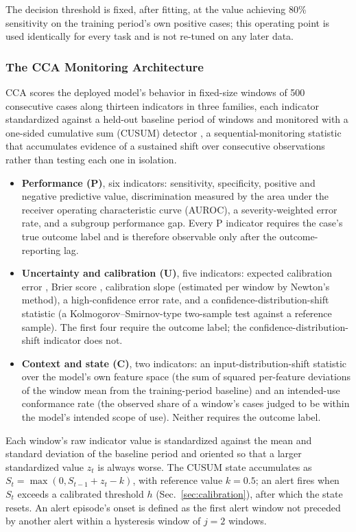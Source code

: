 \documentclass[apajournal,article,submit,oneauthor]{Definitions/mdpi}
\begin{document}
The decision threshold is fixed, after fitting, at the value achieving 80\% sensitivity on the training period's own positive cases; this operating point is used identically for every task and is not re-tuned on any later data.

\subsubsection{The CCA Monitoring Architecture}\label{sec:indicators}

CCA scores the deployed model's behavior in fixed-size windows of 500 consecutive cases along thirteen indicators in three families, each indicator standardized against a held-out baseline period of windows and monitored with a one-sided cumulative sum (CUSUM) detector \citep{page1954}, a sequential-monitoring statistic that accumulates evidence of a sustained shift over consecutive observations rather than testing each one in isolation.

\begin{itemize}
\item \textbf{Performance (P)}, six indicators: sensitivity, specificity, positive and negative predictive value, discrimination measured by the area under the receiver operating characteristic curve (AUROC), a severity-weighted error rate, and a subgroup performance gap. Every P indicator requires the case's true outcome label and is therefore observable only after the outcome-reporting lag.
\item \textbf{Uncertainty and calibration (U)}, five indicators: expected calibration error \citep{naeini2015}, Brier score \citep{brier1950}, calibration slope (estimated per window by Newton's method), a high-confidence error rate, and a confidence-distribution-shift statistic (a Kolmogorov--Smirnov-type two-sample test against a reference sample). The first four require the outcome label; the confidence-distribution-shift indicator does not.
\item \textbf{Context and state (C)}, two indicators: an input-distribution-shift statistic over the model's own feature space (the sum of squared per-feature deviations of the window mean from the training-period baseline) and an intended-use conformance rate (the observed share of a window's cases judged to be within the model's intended scope of use). Neither requires the outcome label.
\end{itemize}

Each window's raw indicator value is standardized against the mean and standard deviation of the baseline period and oriented so that a larger standardized value $z_t$ is always worse. The CUSUM state accumulates as $S_t = \max(0, S_{t-1} + z_t - k)$, with reference value $k = 0.5$; an alert fires when $S_t$ exceeds a calibrated threshold $h$ (Sec.~\ref{sec:calibration}), after which the state resets. An alert episode's onset is defined as the first alert window not preceded by another alert within a hysteresis window of $j = 2$ windows.
\end{document}
